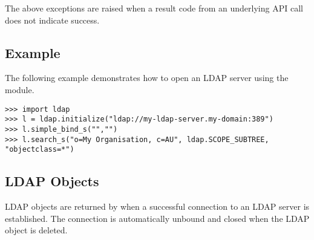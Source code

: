 The above exceptions are raised when a result code from an underlying API
call does not indicate success.

%



\subsection{Example \label{ldap-example}}

The following example demonstrates how to open an LDAP server using the
 module.

\begin{verbatim}
>>> import ldap
>>> l = ldap.initialize("ldap://my-ldap-server.my-domain:389")
>>> l.simple_bind_s("","")
>>> l.search_s("o=My Organisation, c=AU", ldap.SCOPE_SUBTREE, "objectclass=*")
\end{verbatim}


\subsection{LDAP Objects}
\label{ldap-objects}

LDAP objects are returned by  when a successful
connection to an LDAP server is established.
The connection is automatically unbound and closed 
when the LDAP object is deleted.

